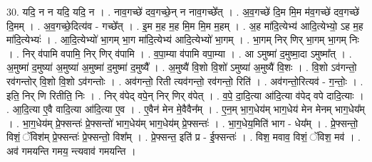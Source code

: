 \documentclass[17pt]{extarticle}
\begin{document}
30. यदि॒ न न यदि॒ यदि॒ न । . नाव॒गच्छे॑ दव॒गच्छे॒न् न नाव॒गच्छे᳚त् । . अ॒व॒गच्छे॑ दि॒म मि॒म म॑व॒गच्छे॑ दव॒गच्छे॑ दि॒मम् । . अ॒व॒गच्छे॒दित्य॑व - गच्छे᳚त् । . इ॒म म॒ह म॒ह मि॒म मि॒म म॒हम् । . अ॒ह मा॑दि॒त्येभ्य॑ आदि॒त्येभ्यो॒ ऽह म॒ह मा॑दि॒त्येभ्यः॑ । . आ॒दि॒त्येभ्यो॑ भा॒गम् भा॒ग मा॑दि॒त्येभ्य॑ आदि॒त्येभ्यो॑ भा॒गम् । . भा॒गम् निर् णिर् भा॒गम् भा॒गम् निः । . निर् व॑पामि वपामि॒ निर् णिर् व॑पामि । . व॒पा॒म्या व॑पामि वपा॒म्या । . आ ऽमुष्मा॑ द॒मुष्मा॒दा ऽमुष्मा᳚त् । . अ॒मुष्मा॑ द॒मुष्या॑ अ॒मुष्या॑ अ॒मुष्मा॑ द॒मुष्मा॑ द॒मुष्यै᳚ । . अ॒मुष्यै॑ वि॒शो वि॒शो॑ ऽमुष्या॑ अ॒मुष्यै॑ वि॒शः । . वि॒शो ऽव॑गन्तो॒ रव॑गन्तोर् वि॒शो वि॒शो ऽव॑गन्तोः । . अव॑गन्तो॒ रिती त्यव॑गन्तो॒ रव॑गन्तो॒ रिति॑ । . अव॑गन्तो॒रित्यव॑ - ग॒न्तोः॒ । . इति॒ निर् णि रितीति॒ निः । . निर् व॑पेद् वपे॒न् निर् णिर् व॑पेत् । . व॒पे॒ दा॒दि॒त्या आ॑दि॒त्या व॑पेद् वपे दादि॒त्याः । . आ॒दि॒त्या ए॒वै वादि॒त्या आ॑दि॒त्या ए॒व । . ए॒वैन॑ मेन मे॒वैवैन᳚म् । . ए॒न॒म् भा॒ग॒धेय॑म् भाग॒धेय॑ मेन मेनम् भाग॒धेय᳚म् । . भा॒ग॒धेय॑म् प्रे॒फ्सन्तः॑ प्रे॒फ्सन्तो॑ भाग॒धेय॑म् भाग॒धेय॑म् प्रे॒फ्सन्तः॑ । . भा॒ग॒धेय॒मिति॑ भाग - धेय᳚म् । . प्रे॒फ्सन्तो॒ विशं॒ ॅविश॑म् प्रे॒फ्सन्तः॑ प्रे॒फ्सन्तो॒ विश᳚म् । . प्रे॒फ्सन्त॒ इति॑ प्र - ई॒फ्सन्तः॑ । . विश॒ मवाव॒ विशं॒ ॅविश॒ मव॑ । . अव॑ गमयन्ति गमय॒ न्त्यवाव॑ गमयन्ति । \newline
\end{document}
